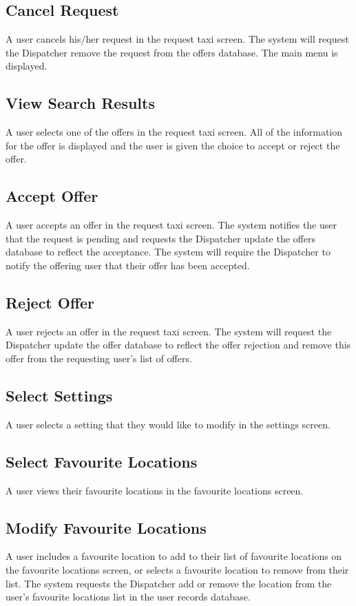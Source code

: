 \documentclass[english]{article}
\begin{document}
\subsection{Cancel Request}
A user cancels his/her request in the request taxi screen. The system will request the Dispatcher remove the request from the offers database. The main menu is displayed. 
\subsection{View Search Results}
A user selects one of the offers in the request taxi screen. All of the information for the offer is displayed and the user is given the choice to accept or reject the offer. 
\subsection{Accept Offer}
A user accepts an offer in the request taxi screen. The system notifies the user that the request is pending and requests the Dispatcher update the offers database to reflect the acceptance. The system will require the Dispatcher to notify the offering user that their offer has been accepted. 
\subsection{Reject Offer}
A user rejects an offer in the request taxi screen. The system will request the Dispatcher update the offer database to reflect the offer rejection and remove this offer from the requesting user's list of offers. 
\subsection{Select Settings}
A user selects a setting that they would like to modify in the settings screen.
\subsection{Select Favourite Locations}
A user views their favourite locations in the favourite locations screen.
\subsection{Modify Favourite Locations}
A user includes a favourite location to add to their list of favourite locations on the favourite locations screen, or selects a favourite location to remove from their list. The system requests the Dispatcher add or remove the location from the user's favourite locations list in the user records database.
\end{document}
